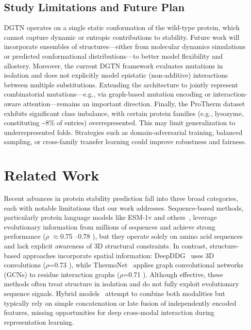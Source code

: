 \documentclass[11pt]{article}
\begin{document}
\subsection*{Study Limitations and Future Plan}


DGTN operates on a single static conformation of the wild-type protein,
which cannot capture dynamic or entropic contributions to stability. Future
work will incorporate ensembles of structures—either from molecular dynamics
simulations or predicted conformational distributions—to better model
flexibility and allostery.
Moreover, 
the current DGTN framework evaluates mutations in isolation and does not explicitly
model epistatic (non-additive) interactions between multiple substitutions.
Extending the architecture to jointly represent combinatorial mutations—e.g.,
via graph-based mutation encoding or interaction-aware attention—remains an
important direction.
Finally, the ProTherm dataset exhibits significant class imbalance, with certain protein
families (e.g., lysozyme, constituting \textasciitilde8\% of entries)
overrepresented. This may limit generalization to underrepresented folds.
Strategies such as domain-adversarial training, balanced sampling, or
cross-family transfer learning could improve robustness and fairness.

\section{Related Work}

Recent advances in protein stability prediction fall into three broad
categories, each with notable limitations that our work addresses.
Sequence-based methods, particularly protein language models like ESM-1v and
others~\cite{meier2021language,rives2021biological}, leverage evolutionary
information from millions of sequences and achieve strong performance ($\rho$ $\approx$0.75
–0.78 ), but they operate solely on amino acid sequences and lack explicit
awareness of 3D structural constraints. In contrast, structure-based approaches
incorporate spatial information: DeepDDG~\cite{cao2019deepddg} uses 3D
convolutions ($\rho$=0.73 ), while ThermoNet~\cite{li2020predicting} applies graph
convolutional networks (GCNs) to residue interaction graphs ($\rho$=0.71 ). Although
effective, these methods often treat structure in isolation and do not fully
exploit evolutionary sequence signals. Hybrid models~\cite{zhou2020mutation}
attempt to combine both modalities but typically rely on simple concatenation
or late fusion of independently encoded features, missing opportunities for
deep cross-modal interaction during representation learning.
\end{document}

